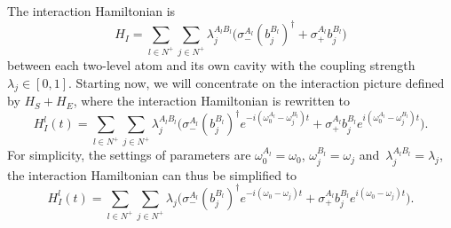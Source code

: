\documentclass[
showpacs,  %
showkeys,  %
aps,       %
amsthm,    %
amsmath,   %
amsfonts,  %
amssymb    %
]{revtex4-1}          %
\begin{document}
The interaction Hamiltonian is
\begin{equation}
\label{e3}
{H_I} = \sum\limits_{l \in N^+} {\sum\limits_{j \in N^+} {\lambda_j^{{A_l}{B_l}}(\sigma_ - ^{{A_l}}} {{(b_j^{{B_l}})}^\dag} + \sigma_+ ^{{A_l}}b_j^{{B_l}})}
\end{equation}
between each two-level atom and its own cavity with the coupling strength ${\lambda _j}\in\left[{0,1}\right]$. Starting now, we will concentrate on the interaction picture defined by ${H_S} + {H_E}$, where the interaction Hamiltonian is rewritten to
\begin{equation}
\label{e4}
{H^l_I}(t) = \sum\limits_{l \in N^+} {\sum\limits_{j \in N^+} {\lambda_j^{{A_l}{B_l}}(\sigma_- ^{{A_l}}} {{(b_j^{{B_l}})}^\dag }{e^{ - i(\omega_0^{{A_l}} - \omega_j^{{B_l}})t}} + \sigma_ + ^{{A_l}}b_j^{{B_l}}{e^{i(\omega_0^{{A_l}} - \omega_j^{{B_l}})t}})}.
\end{equation}
For simplicity, the settings of parameters are $\omega_0^{A_l}={\omega_0}$, $\omega_j^{B_l}={\omega_j}$ and $\,\lambda_j^{{A_l}{B_l}} = {\lambda_j}$, the interaction Hamiltonian can thus be simplified to
\begin{equation}
\label{e5}
{H^l_I}(t) = \sum\limits_{l \in N^+} {\sum\limits_{j \in N^+} {{\lambda_j}(\sigma_- ^{{A_l}}} {{(b_j^{{B_l}})}^\dag }{e^{- i({\omega_0} - {\omega_j})t}} + \sigma_ + ^{{A_l}}b_j^{{B_l}}{e^{i({\omega_0} - {\omega_j})t}})}.
\end{equation}
\end{document}
